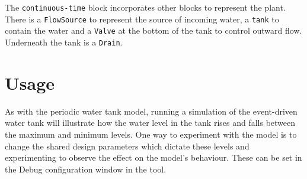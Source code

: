 The \texttt{continuous-time} block incorporates other blocks to
represent the plant.  There is a \texttt{FlowSource} to represent the
source of incoming water, a \texttt{tank} to contain the water and a
\texttt{Valve} at the bottom of the tank to control outward flow.
Underneath the tank is a \texttt{Drain}.

\section{Usage}
As with the periodic water tank model, running a simulation of the
event-driven water tank will illustrate how the water level in the
tank rises and falls between the maximum and minimum levels.  One way
to experiment with the model is to change the shared design parameters
which dictate these levels and experimenting to observe the effect on
the model's behaviour.  These can be set in the Debug configuration
window in the \DESTECS tool.

